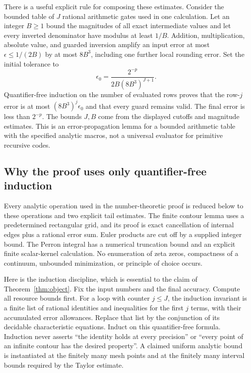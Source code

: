 There is a useful explicit rule for composing these estimates. Consider
the bounded table of $J$ rational arithmetic gates used in one calculation.
Let an integer $B\ge1$ bound the magnitudes of all exact intermediate
values and let every inverted denominator have modulus at least $1/B$.
Addition, multiplication, absolute value, and guarded inversion amplify
an input error at most $\epsilon\le1/(2B)$ by at most $8B^3$, including
one further local rounding error. Set the initial tolerance to
\[
 \epsilon_0=\frac{2^{-p}}{2B(8B^3)^{J+1}}.
\]
Quantifier-free induction on the number of evaluated rows proves that
the row-$j$ error is at most $(8B^3)^j\epsilon_0$ and that every guard
remains valid. The final error is less than $2^{-p}$. The bounds $J,B$
come from the displayed cutoffs and magnitude estimates. This is an
error-propagation lemma for a bounded arithmetic table with the specified
analytic macros, not a universal evaluator for primitive recursive codes.

\subsection{Why the proof uses only quantifier-free induction}

Every analytic operation used in the number-theoretic proof is reduced
below to these operations and two explicit tail estimates. The finite
contour lemma uses a predetermined rectangular grid, and its proof is
exact cancellation of internal edges plus a rational error sum. Euler
products are cut off by a supplied integer bound. The Perron integral
has a numerical truncation bound and an explicit finite scalar-kernel
calculation. No enumeration of zeta zeros, compactness of a continuum,
unbounded minimization, or principle of choice occurs.

Here is the induction discipline, which is essential to the claim of
Theorem~\ref{thm:object}. Fix the input numbers and the final accuracy.
Compute all resource bounds first. For a loop with counter $j\le J$,
the induction invariant is a finite list of rational identities and
inequalities for the first $j$ terms, with their accumulated error
allowances. Replace that list by the conjunction of its decidable
characteristic equations. Induct on this quantifier-free formula.
Induction never asserts ``the identity holds at every precision'' or
``every point of an infinite contour has the desired property''.
A claimed uniform analytic bound is instantiated at the finitely many
mesh points and at the finitely many interval bounds required by the
Taylor estimate.

